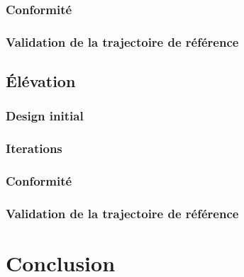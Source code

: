 \documentclass{udes_rapport} %
\begin{document}
\subsubsection{Conformité}
\subsubsection{Validation de la trajectoire de référence}
\subsection{Élévation}
\subsubsection{Design initial}
\subsubsection{Iterations}

\subsubsection{Conformité}
\subsubsection{Validation de la trajectoire de référence}
\section{Conclusion}
\end{document}
